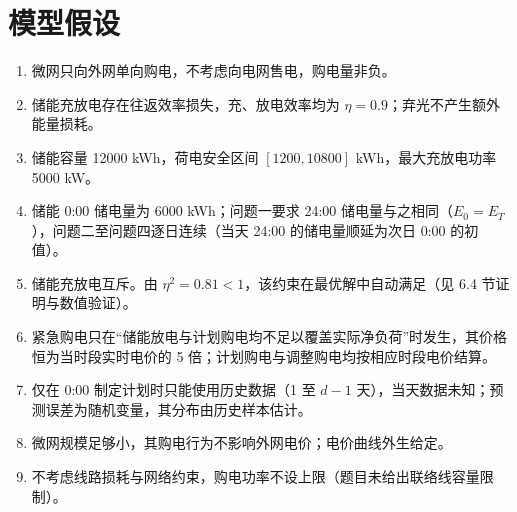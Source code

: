 \documentclass{cumcmthesis}
\begin{document}
\section{模型假设}
\begin{enumerate}
    \item 微网只向外网单向购电，不考虑向电网售电，购电量非负。
    \item 储能充放电存在往返效率损失，充、放电效率均为 $\eta=0.9$；弃光不产生额外能量损耗。
    \item 储能容量 12000 kWh，荷电安全区间 $[1200,10800]$ kWh，最大充放电功率 5000 kW。
    \item 储能 0:00 储电量为 6000 kWh；问题一要求 24:00 储电量与之相同（$E_0=E_T$），问题二至问题四逐日连续（当天 24:00 的储电量顺延为次日 0:00 的初值）。
    \item 储能充放电互斥。由 $\eta^2=0.81<1$，该约束在最优解中自动满足（见 6.4 节证明与数值验证）。
    \item 紧急购电只在“储能放电与计划购电均不足以覆盖实际净负荷”时发生，其价格恒为当时段实时电价的 5 倍；计划购电与调整购电均按相应时段电价结算。
    \item 仅在 0:00 制定计划时只能使用历史数据（1 至 $d-1$ 天），当天数据未知；预测误差为随机变量，其分布由历史样本估计。
    \item 微网规模足够小，其购电行为不影响外网电价；电价曲线外生给定。
    \item 不考虑线路损耗与网络约束，购电功率不设上限（题目未给出联络线容量限制）。
\end{enumerate}
\end{document}
